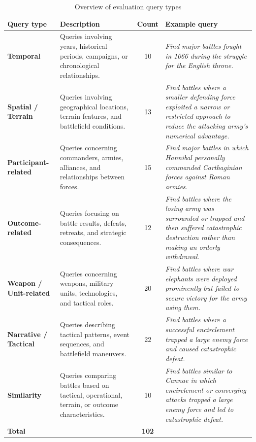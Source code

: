 \begin{table}[htbp]
\centering
\caption{Overview of evaluation query types}
\label{tab:query_types}

\scriptsize
\renewcommand{\arraystretch}{1.3}
\setlength{\tabcolsep}{3pt}

\begin{tabular}{p{} p{} c p{}}
\toprule
\textbf{Query type} &
\textbf{Description} &
\textbf{Count} &
\textbf{Example query} \\
\midrule

\textbf{Temporal} &
Queries involving years, historical periods, campaigns, or chronological relationships. &
10 &
\textit{Find major battles fought in 1066 during the struggle for the English throne.} \\
\midrule

\textbf{Spatial / Terrain} &
Queries involving geographical locations, terrain features, and battlefield conditions. &
13 &
\textit{Find battles where a smaller defending force exploited a narrow or restricted approach to reduce the attacking army's numerical advantage.} \\
\midrule

\textbf{Participant-related} &
Queries concerning commanders, armies, alliances, and relationships between forces. &
15 &
\textit{Find major battles in which Hannibal personally commanded Carthaginian forces against Roman armies.} \\
\midrule

\textbf{Outcome-related} &
Queries focusing on battle results, defeats, retreats, and strategic consequences. &
12 &
\textit{Find battles where the losing army was surrounded or trapped and then suffered catastrophic destruction rather than making an orderly withdrawal.} \\
\midrule

\textbf{Weapon / Unit-related} &
Queries concerning weapons, military units, technologies, and tactical roles. &
20 &
\textit{Find battles where war elephants were deployed prominently but failed to secure victory for the army using them.} \\
\midrule

\textbf{Narrative / Tactical} &
Queries describing tactical patterns, event sequences, and battlefield maneuvers. &
22 &
\textit{Find battles where a successful encirclement trapped a large enemy force and caused catastrophic defeat.} \\
\midrule

\textbf{Similarity} &
Queries comparing battles based on tactical, operational, terrain, or outcome characteristics. &
10 &
\textit{Find battles similar to Cannae in which encirclement or converging attacks trapped a large enemy force and led to catastrophic defeat.} \\
\midrule

\textbf{Total} &
&
\textbf{102} &
\\

\bottomrule
\end{tabular}
\end{table}
